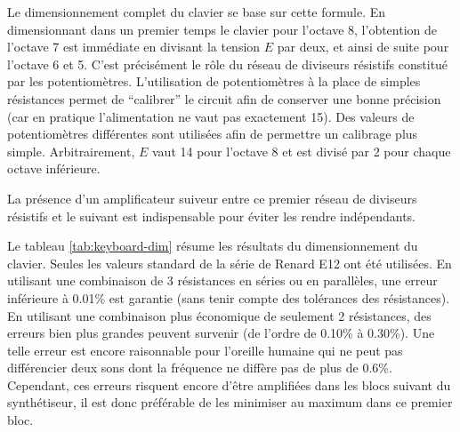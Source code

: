 Le dimensionnement complet du clavier se base
sur cette formule. En dimensionnant dans un premier
temps le clavier pour l'octave 8, l'obtention
de l'octave 7 est immédiate en divisant la tension
$E$ par deux, et ainsi de suite pour l'octave 6 et 5.
C'est précisément le rôle du réseau de diviseurs
résistifs constitué par les potentiomètres. L'utilisation
de potentiomètres à la place de simples résistances
permet de ``calibrer'' le circuit afin de conserver
une bonne précision (car en pratique l'alimentation
ne vaut pas exactement \unit{15}{\volt}).
Des valeurs de potentiomètres différentes sont utilisées
afin de permettre un calibrage plus simple.
Arbitrairement, $E$ vaut \unit{14}{\volt} pour l'octave
8 et est divisé par 2 pour chaque octave inférieure.

La présence d'un amplificateur suiveur entre ce premier
réseau de diviseurs résistifs et le suivant est indispensable
pour éviter les rendre indépendants.

Le tableau \ref{tab:keyboard-dim} résume les résultats du dimensionnement
du clavier. Seules les valeurs standard de la série de Renard
E12 ont été utilisées. En utilisant une combinaison de 3
résistances en séries ou en parallèles, une erreur inférieure
à 0.01\% est garantie (sans tenir compte des tolérances des
résistances). En utilisant une combinaison plus économique
de seulement 2 résistances, des erreurs bien plus grandes
peuvent survenir (de l'ordre de 0.10\% à 0.30\%). Une telle
erreur est encore raisonnable pour l'oreille humaine qui ne
peut pas différencier deux sons dont la fréquence ne diffère
pas de plus de 0.6\%\cite{frequency-jnd}. Cependant, ces erreurs
risquent encore d'être amplifiées dans les blocs suivant du
synthétiseur, il est donc préférable de les minimiser au maximum
dans ce premier bloc.

